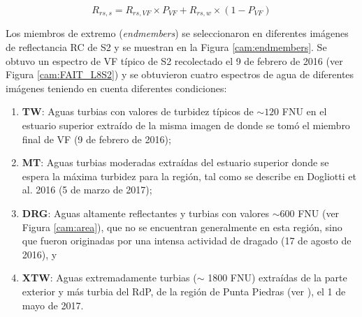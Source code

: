         
        \begin{equation}
            R_{rs,s} = R_{rs,VF}\times P_{VF} + R_{rs,w} \times (1-P_{VF})
            \label{cam:eq:endmembers}
        \end{equation}
        
        \noindent
        Los miembros de extremo (\textit{endmembers}) se seleccionaron en diferentes imágenes de reflectancia RC de S2 y se muestran en la Figura \ref{cam:endmembers}. Se obtuvo un espectro de VF típico de S2 recolectado el 9 de febrero de 2016 (ver Figura \ref{cam:FAIT_L8S2}) y se obtuvieron cuatro espectros de agua de diferentes imágenes teniendo en cuenta diferentes condiciones:
        
        \begin{enumerate}
            \item \textbf{TW}: Aguas turbias con valores de turbidez típicos de $\sim 120$ FNU en el estuario superior \cite{dogliotti2015} extraído de la misma imagen de donde se tomó el miembro final de VF (9 de febrero de 2016);
            \item \textbf{MT}: Aguas turbias moderadas extraídas del estuario superior donde se espera la máxima turbidez para la región, tal como se describe en Dogliotti et al. 2016 \cite{dogliotti2016} (5 de marzo de 2017);
            \item \textbf{DRG}: Aguas altamente reflectantes y turbias con valores $\sim 600$ FNU (ver Figura \ref{cam:area}), que no se encuentran generalmente en esta región, sino que fueron originadas por una intensa actividad de dragado (17 de agosto de 2016), y
            \item \textbf{XTW}: Aguas extremadamente turbias ($\sim$ 1800 FNU) extraídas de la parte exterior y más turbia del RdP, de la región de Punta Piedras (ver \cite{dogliotti2016}), el 1 de mayo de 2017.
        \end{enumerate}
        
